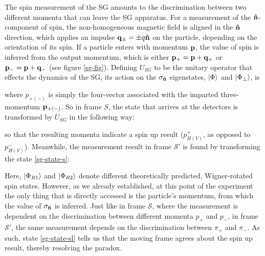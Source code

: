 \documentclass[12pt,a4paper,notitlepage]{report}
\begin{document}
The spin measurement of the SG amounts to the discrimination between two different momenta that can leave the SG apparatus. For a measurement of the $\vu{n}$-component of spin, the non-homogeneous magnetic field is aligned in the $\vu{n}$ direction, which applies an impulse $\vb{q}_{\pm} = \pm q \vu{n}$ on the particle, depending on the orientation of its spin. If a particle enters with momentum $\vb{p}$, the value of spin is inferred from the output momentum, which is either $\vb{p}_+ = \vb{p} + \vb{q}_+$ or $\vb{p}_- = \vb{p} + \vb{q}_-$ (see figure \ref{sg-fig}). Defining $U_{SG}$ to be the unitary operator that effects the dynamics of the SG, its action on the $\sigma_{\vu{n}}$ eigenstates, $\ket{\Phi}$ and $\ket{\Phi_{\bot}}$, is

%
where $p_{+(-)}$ is simply the four-vector associated with the imparted three-momentum $\vb{p}_{+(-)}$.
So in frame $S$, the state that arrives at the detectors is transformed by $U_{SG}$ in the following way:

%
so that the resulting momenta indicate a spin up result ($p^+_{H(V)}$, as opposed to $p^-_{H(V)}$). Meanwhile, the measurement result in frame $\mathcal{S}'$ is found by transforming the state \eqref{sg-state-s}:

%
Here, $\ket{\Phi_{R1}}$ and $\ket{\Phi_{R2}}$ denote different theoretically predicted, Wigner-rotated spin states. However, as we already established, at this point of the experiment the only thing that is directly accessed is the particle's momentum, from which the value of $\sigma_{\vu{n}}$ is inferred.
Just like in frame $\mathcal{S}$, where the measurement is dependent on the discrimination between different momenta $p_+$ and $p_-$, in frame $\mathcal{S}'$, the same measurement depends on the discrimination between $\pi_+$ and $\pi_-$. As such, state \eqref{sg-state-sl} tells us that the moving frame agrees about the spin up result, thereby resolving the paradox.
\end{document}
